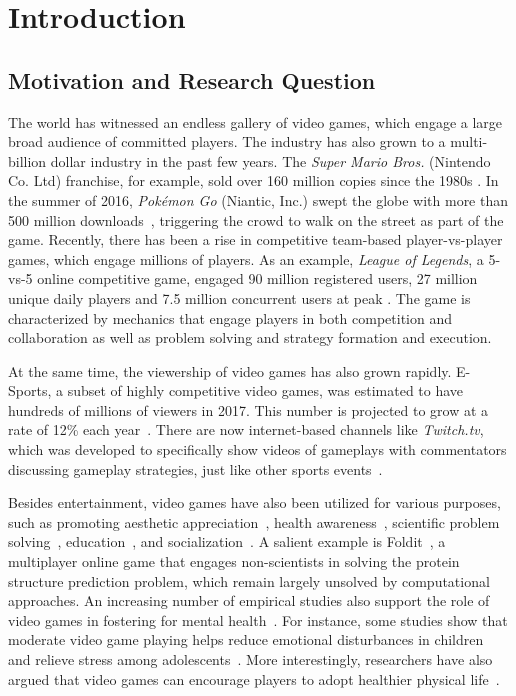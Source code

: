 
\chapter{Introduction} %

\label{chapter:intro} 

\section{Motivation and Research Question}\label{chap1:motiv}

The world has witnessed an endless gallery of video games, which engage a large broad audience of committed players. The industry has also grown to a multi-billion dollar industry in the past few years. The \textit{Super Mario Bros.}  (Nintendo Co. Ltd) franchise, for example, sold over 160 million copies since the 1980s \citep{mariosale}. In the summer of 2016, \textit{Pok\'{e}mon Go} (Niantic, Inc.) swept the globe with more than 500 million downloads~\citep{pokemongo}, triggering the crowd to walk on the street as part of the game. Recently, there has been a rise in competitive team-based player-vs-player games, which engage millions of players. As an example, \textit{League of Legends}, a 5-vs-5 online competitive game, engaged 90 million registered users, 27 million unique daily players and 7.5 million concurrent users at peak \citep{lol_fanbase,lol_27million}. The game is characterized by mechanics that engage players in both competition and collaboration as well as problem solving and strategy formation and execution. 

At the same time, the viewership of video games has also grown rapidly. E-Sports, a subset of highly competitive video games, was estimated to have hundreds of millions of viewers in 2017. This number is projected to grow at a rate of 12\% each year~\citep{superdata2017}. There are now internet-based channels like \textit{Twitch.tv}, which was developed to specifically show videos of gameplays with commentators discussing gameplay strategies, just like other sports events~\citep{superdata2017stream}.  

Besides entertainment, video games have also been utilized for various purposes, such as promoting aesthetic appreciation~\citep{jarvinen2008understanding}, health awareness~\citep{shiyko2016effects}, scientific problem solving~\citep{cooper2010predicting}, education~\citep{gee2003video}, and socialization~\citep{ferguson2013friends}. A salient example is Foldit~\citep{cooper2010predicting}, a multiplayer online game that engages non-scientists in solving the protein structure prediction problem, which remain largely unsolved by computational approaches. An increasing number of empirical studies also support the role of video games in fostering for mental health~\citep{jones2014gaming}. For instance, some studies show that moderate video game playing helps reduce emotional disturbances in children~\citep{hull2009computer} and relieve stress among adolescents~\citep{colwell2007needs}. More interestingly, researchers have also argued that video games can encourage players to adopt healthier physical life~\citep{shiyko2016effects}. 


